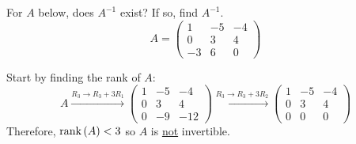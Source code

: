 \begin{example}{}{}
    For $A$ below, does $A^{-1}$ exist? If so, find $A^{-1}$.
    \[
        A = \begin{pmatrix}
            1 & -5 & -4 \\
            0 & 3 & 4 \\
            -3 & 6 & 0
        \end{pmatrix} 
    \]
    \begin{solution}
        Start by finding the rank of $A$: 
        \[
            A \xrightarrow{R_3 \to R_3 + 3R_1}
            \begin{pmatrix}
                1 & -5 & -4 \\
                0 & 3 & 4 \\
                0 & -9 & -12
            \end{pmatrix} 
            \xrightarrow{R_3 \to R_3 + 3R_2}
            \begin{pmatrix}
                1 & -5 & -4 \\
                0 & 3 & 4 \\
                0 & 0 & 0
            \end{pmatrix}
        \]
        Therefore, $\text{rank}\left(A\right) < 3$ so $A$ is \underline{not} invertible.
    \end{solution}
\end{example}

